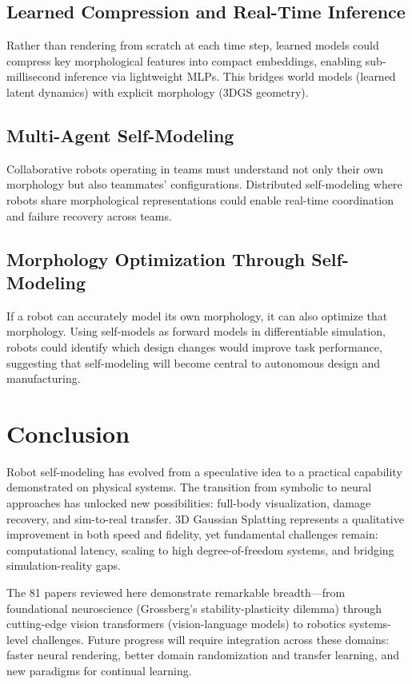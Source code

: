 \documentclass[journal]{IEEEtran}
\begin{document}
\subsection{Learned Compression and Real-Time Inference}

Rather than rendering from scratch at each time step, learned models could compress key morphological features into compact embeddings, enabling sub-millisecond inference via lightweight MLPs. This bridges world models (learned latent dynamics) with explicit morphology (3DGS geometry).

\subsection{Multi-Agent Self-Modeling}

Collaborative robots operating in teams must understand not only their own morphology but also teammates' configurations. Distributed self-modeling where robots share morphological representations could enable real-time coordination and failure recovery across teams.

\subsection{Morphology Optimization Through Self-Modeling}

If a robot can accurately model its own morphology, it can also optimize that morphology. Using self-models as forward models in differentiable simulation, robots could identify which design changes would improve task performance, suggesting that self-modeling will become central to autonomous design and manufacturing.

\section{Conclusion}

Robot self-modeling has evolved from a speculative idea to a practical capability demonstrated on physical systems. The transition from symbolic to neural approaches has unlocked new possibilities: full-body visualization, damage recovery, and sim-to-real transfer. 3D Gaussian Splatting represents a qualitative improvement in both speed and fidelity, yet fundamental challenges remain: computational latency, scaling to high degree-of-freedom systems, and bridging simulation-reality gaps.

The 81 papers reviewed here demonstrate remarkable breadth---from foundational neuroscience (Grossberg's stability-plasticity dilemma) through cutting-edge vision transformers (vision-language models) to robotics systems-level challenges. Future progress will require integration across these domains: faster neural rendering, better domain randomization and transfer learning, and new paradigms for continual learning.
\end{document}
